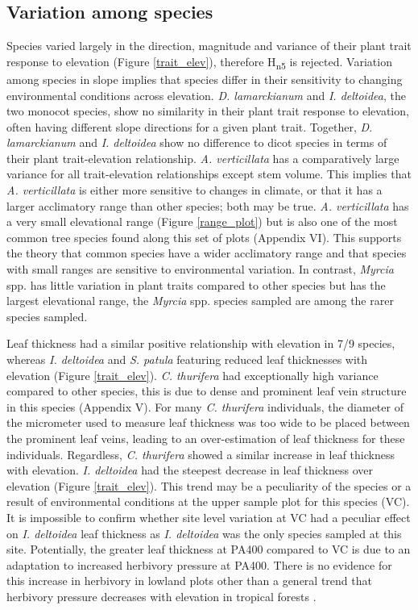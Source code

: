 \documentclass[a4paper, 11pt]{article}
\begin{document}
\subsection*{Variation among species}
Species varied largely in the direction, magnitude and variance of their plant trait response to elevation (Figure \ref{trait_elev}), therefore H\textsubscript{n5} is rejected. Variation among species in slope implies that species differ in their sensitivity to changing environmental conditions across elevation. \textit{D. lamarckianum} and \textit{I. deltoidea}, the two monocot species, show no similarity in their plant trait response to elevation, often having different slope directions for a given plant trait. Together, \textit{D. lamarckianum} and \textit{I. deltoidea} show no difference to dicot species in terms of their plant trait-elevation relationship. \textit{A. verticillata} has a comparatively large variance for all trait-elevation relationships except stem volume. This implies that \textit{A. verticillata} is either more sensitive to changes in climate, or that it has a larger acclimatory range than other species; both may be true. \textit{A. verticillata} has a very small elevational range (Figure \ref{range_plot}) but is also one of the most common tree species found along this set of plots (Appendix VI). This supports the theory that common species have a wider acclimatory range and that species with small ranges are sensitive to environmental variation. In contrast, \textit{Myrcia} spp. has little variation in plant traits compared to other species but has the largest elevational range, the \textit{Myrcia} spp. species sampled are among the rarer species sampled.

Leaf thickness had a similar positive relationship with elevation in 7/9 species, whereas \textit{I. deltoidea} and \textit{S. patula} featuring reduced leaf thicknesses with elevation (Figure \ref{trait_elev}). \textit{C. thurifera} had exceptionally high variance compared to other species, this is due to dense and prominent leaf vein structure in this species (Appendix V). For many \textit{C. thurifera} individuals, the diameter of the micrometer used to measure leaf thickness was too wide to be placed between the prominent leaf veins, leading to an over-estimation of leaf thickness for these individuals. Regardless, \textit{C. thurifera} showed a similar increase in leaf thickness with elevation. \textit{I. deltoidea} had the steepest decrease in leaf thickness over elevation (Figure \ref{trait_elev}). This trend may be a peculiarity of the species or a result of environmental conditions at the upper sample plot for this species (VC). It is impossible to confirm whether site level variation at VC had a peculiar effect on \textit{I. deltoidea} leaf thickness as \textit{I. deltoidea} was the only species sampled at this site. Potentially, the greater leaf thickness at PA400 compared to VC is due to an adaptation to increased herbivory pressure at PA400. There is no evidence for this increase in herbivory in lowland plots other than a general trend that herbivory pressure decreases with elevation in tropical forests \citep{Rodriguez-Castaeda2010}.
\end{document}
